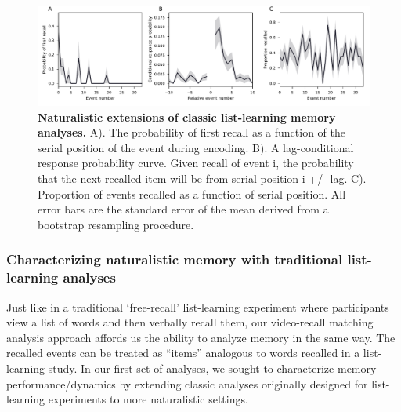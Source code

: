 \documentclass{article}
\begin{document}
{\begin{figure}[t!]
\centering
\includegraphics[width=1\textwidth]{figs/3_list_learning.pdf}
\caption{\small \textbf{Naturalistic extensions of classic list-learning memory analyses.} A). The probability of first recall as a function of the serial position of the event during encoding. B). A lag-conditional response probability curve. Given recall of event i, the probability that the next recalled item will be from serial position i +/- lag. C). Proportion of events recalled as a function of serial position. All error bars are the standard error of the mean derived from a bootstrap resampling procedure.}
\label{fig:list-learning}
\end{figure}

\subsubsection{Characterizing naturalistic memory with traditional list-learning analyses}
Just like in a traditional `free-recall' list-learning experiment where participants view a list of words and then verbally recall them, our video-recall matching analysis approach affords us the ability to analyze memory in the same way. The recalled events can be treated as ``items'' analogous to words recalled in a list-learning study. In our first set of analyses, we sought to characterize memory performance/dynamics by extending classic analyses originally designed for list-learning experiments to more naturalistic settings.

}
\end{document}
